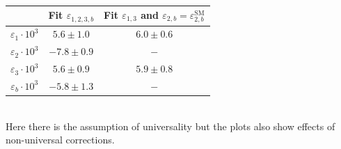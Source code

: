 \documentclass[../main.tex]{subfiles}
\begin{document}
\begin{table}[h]
    \centering
    \begin{tabular}{c|cc}
    \hline
    \rowcolor{gray!45} & Fit $\varepsilon_{1,2,3,b}$ & Fit $\varepsilon_{1,3}$ and $\varepsilon_{2,b}=\varepsilon_{2,b}^{\text{SM}}$\\
    \hline 
    $\varepsilon_1\cdot10^3$ & $5.6\pm1.0$ & $6.0\pm0.6$\\
    $\varepsilon_2\cdot10^3$ & $-7.8\pm0.9$ & $-$\\
    $\varepsilon_3\cdot10^3$ & $5.6\pm0.9$ & $5.9\pm0.8$\\
    $\varepsilon_b\cdot10^3$ & $-5.8\pm1.3$ & $-$\\
    \hline
    \end{tabular}
    \caption*{}
\end{table}\\
Here there is the assumption of universality but the plots also show effects of non-universal corrections. 
\end{document}

